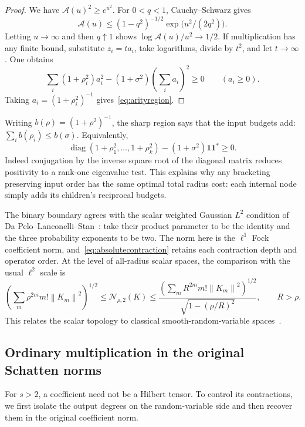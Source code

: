 \documentclass[11pt,a4paper]{amsart}
\numberwithin{equation}{section}
\theoremstyle{definition}
\theoremstyle{remark}
\DeclareMathOperator{\diag}{diag}
\newcommand{\norm}[1]{\left\lVert#1\right\rVert}
\begin{document}
\begin{proof}
We have $\mathcal A(u)^2\ge e^{u^2}$. For $0<q<1$, Cauchy--Schwarz gives
\[
 \mathcal A(u)\le(1-q^2)^{-1/2}\exp\big(u^2/(2q^2)\big).
\]
Letting $u\to\infty$ and then $q\uparrow1$ shows
$\log\mathcal A(u)/u^2\to1/2$.
If multiplication has any finite bound, substitute $z_i=ta_i$, take logarithms, divide by $t^2$, and let $t\to\infty$. One obtains
\[
 \sum_i(1+\rho_i^2)a_i^2-(1+\sigma^2)\left(\sum_i a_i\right)^2\ge0
 \qquad(a_i\ge0).
\]
Taking $a_i=(1+\rho_i^2)^{-1}$ gives~\eqref{eq:arityregion}.
\end{proof}

Writing $b(\rho)=(1+\rho^2)^{-1}$, the sharp region says that the input budgets add: $\sum_i b(\rho_i)\le b(\sigma)$. Equivalently,
\[
 \diag(1+\rho_1^2,\ldots,1+\rho_k^2)
 -(1+\sigma^2)\mathbf1\mathbf1^*\ge0.
\]
Indeed conjugation by the inverse square root of the diagonal matrix reduces positivity to a rank-one eigenvalue test. This explains why any bracketing preserving input order has the same optimal total radius cost: each internal node simply adds its children's reciprocal budgets.

The binary boundary agrees with the scalar weighted Gaussian $L^2$ condition of Da Pelo--Lanconelli--Stan~\cite[Corollary~5.5]{DPLS}: take their product parameter to be the identity and the three probability exponents to be two. The norm here is the $\ell^1$ Fock coefficient norm, and~\eqref{eq:absolutecontraction} retains each contraction depth and operator order. At the level of all-radius scalar spaces, the comparison with the usual $\ell^2$ scale is
\begin{equation}\label{eq:l1l2}
 \left(\sum_m\rho^{2m}m!\norm{K_m}^2\right)^{1/2}
 \le\mathcal N_{\rho,2}(K)
 \le\frac{\left(\sum_mR^{2m}m!\norm{K_m}^2\right)^{1/2}}
 {\sqrt{1-(\rho/R)^2}},\qquad R>\rho.
\end{equation}
This relates the scalar topology to classical smooth-random-variable spaces~\cite{PT}.

\subsection{Ordinary multiplication in the original Schatten norms}
For $s>2$, a coefficient need not be a Hilbert tensor. To control its contractions, we first isolate the output degrees on the random-variable side and then recover them in the original coefficient norm.
\end{document}

